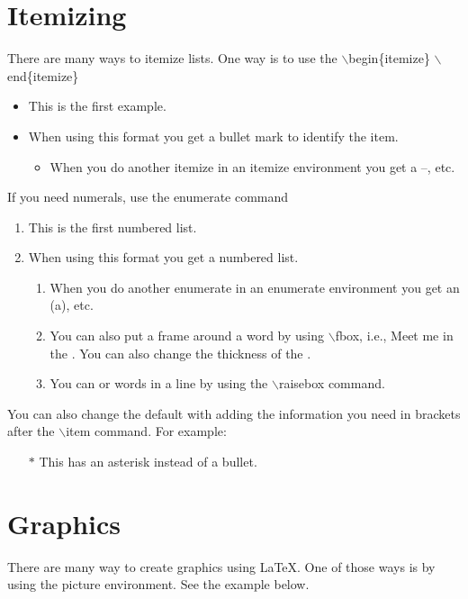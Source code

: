 \documentclass[12pt]{article}   %
\theoremstyle{plain}
\begin{document}
\section{Itemizing}\label{sec:itemize}

There are many ways to itemize lists.  One way is to use the $\backslash$begin\{itemize\} $\backslash$end\{itemize\}
\begin{itemize}
\item This is the first example.
\item When using this format you get a bullet mark to identify the item.
\begin{itemize}
\item When you do another itemize in an itemize environment you get a --, etc.
\end{itemize}
\end{itemize}
If you need numerals, use the enumerate command
\begin{enumerate}
\item This is the first numbered list.
\item When using this format you get a numbered list.
\begin{enumerate}
\item When you do another enumerate in an enumerate environment you get an (a), etc.
\item You can also put a frame around a word by using $\backslash$fbox, i.e., Meet me in the . You can also change the thickness of the \setlength\fboxrule{2pt}.
\item You can \raisebox{.2em}{raise} or \raisebox{-.2em}{lower} words in a line by using the $\backslash$raisebox command.  
\end{enumerate}
\end{enumerate}
You can also change the default with adding the information you need in brackets after the $\backslash$item command. For example:
\begin{itemize}
\item[$\ast$] This has an asterisk instead of a bullet.
\end{itemize}

\section{Graphics}\label{sec:graphics}

There are many way to create graphics using \LaTeX.  One of those ways is by using the picture environment.  See the example below.  
\end{document}
